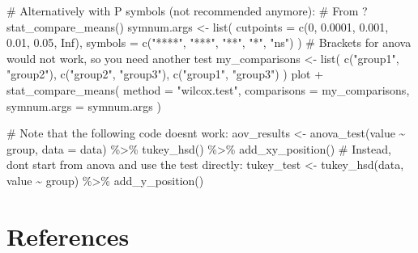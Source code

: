 \documentclass[
  letterpaper,
  DIV=11,
  numbers=noendperiod]{scrreprt}
\newenvironment{Shaded}{\begin{snugshade}}{\end{snugshade}}
\newcommand{\AttributeTok}[1]{\textcolor[rgb]{0.40,0.45,0.13}{#1}}
\newcommand{\CommentTok}[1]{\textcolor[rgb]{0.37,0.37,0.37}{#1}}
\newcommand{\ConstantTok}[1]{\textcolor[rgb]{0.56,0.35,0.01}{#1}}
\newcommand{\DecValTok}[1]{\textcolor[rgb]{0.68,0.00,0.00}{#1}}
\newcommand{\FloatTok}[1]{\textcolor[rgb]{0.68,0.00,0.00}{#1}}
\newcommand{\FunctionTok}[1]{\textcolor[rgb]{0.28,0.35,0.67}{#1}}
\newcommand{\NormalTok}[1]{\textcolor[rgb]{0.00,0.23,0.31}{#1}}
\newcommand{\OtherTok}[1]{\textcolor[rgb]{0.00,0.23,0.31}{#1}}
\newcommand{\SpecialCharTok}[1]{\textcolor[rgb]{0.37,0.37,0.37}{#1}}
\newcommand{\StringTok}[1]{\textcolor[rgb]{0.13,0.47,0.30}{#1}}
\newlength{\cslhangindent}
\newlength{\cslentryspacingunit} %
\newenvironment{CSLReferences}[2] %
 {%
  \setlength{\parindent}{0pt}
  \ifodd #1
  \let\oldpar\par
  \def\par{\hangindent=\cslhangindent\oldpar}
  \fi
  \setlength{\parskip}{#2\cslentryspacingunit}
 }%
 {}
\begin{document}
\begin{Shaded}
\begin{Highlighting}[]
\CommentTok{\# Alternatively with P symbols (not recommended anymore):}
    \CommentTok{\# From ?stat\_compare\_means()}
\NormalTok{    symnum.args }\OtherTok{\textless{}{-}}
      \FunctionTok{list}\NormalTok{(}
        \AttributeTok{cutpoints =} \FunctionTok{c}\NormalTok{(}\DecValTok{0}\NormalTok{, }\FloatTok{0.0001}\NormalTok{, }\FloatTok{0.001}\NormalTok{, }\FloatTok{0.01}\NormalTok{, }\FloatTok{0.05}\NormalTok{, }\ConstantTok{Inf}\NormalTok{),}
        \AttributeTok{symbols =} \FunctionTok{c}\NormalTok{(}\StringTok{"****"}\NormalTok{, }\StringTok{"***"}\NormalTok{, }\StringTok{"**"}\NormalTok{, }\StringTok{"*"}\NormalTok{, }\StringTok{"ns"}\NormalTok{)}
\NormalTok{      )}
    \CommentTok{\# Brackets for anova would not work, so you need another test}
\NormalTok{    my\_comparisons }\OtherTok{\textless{}{-}}
      \FunctionTok{list}\NormalTok{(}
        \FunctionTok{c}\NormalTok{(}\StringTok{"group1"}\NormalTok{, }\StringTok{"group2"}\NormalTok{),}
        \FunctionTok{c}\NormalTok{(}\StringTok{"group2"}\NormalTok{, }\StringTok{"group3"}\NormalTok{),}
        \FunctionTok{c}\NormalTok{(}\StringTok{"group1"}\NormalTok{, }\StringTok{"group3"}\NormalTok{)}
\NormalTok{      )}
\NormalTok{    plot }\SpecialCharTok{+} \FunctionTok{stat\_compare\_means}\NormalTok{(}
      \AttributeTok{method =} \StringTok{"wilcox.test"}\NormalTok{,}
      \AttributeTok{comparisons =}\NormalTok{ my\_comparisons,}
      \AttributeTok{symnum.args =}\NormalTok{ symnum.args}
\NormalTok{    )}
\end{Highlighting}
\end{Shaded}

\begin{Shaded}
\begin{Highlighting}[]
\CommentTok{\# Note that the following code doesn\textquotesingle{}t work:}
\NormalTok{aov\_results }\OtherTok{\textless{}{-}} \FunctionTok{anova\_test}\NormalTok{(value }\SpecialCharTok{\textasciitilde{}}\NormalTok{ group, }\AttributeTok{data =}\NormalTok{ data) }\SpecialCharTok{\%\textgreater{}\%}
  \FunctionTok{tukey\_hsd}\NormalTok{() }\SpecialCharTok{\%\textgreater{}\%}
  \FunctionTok{add\_xy\_position}\NormalTok{()}
\CommentTok{\# Instead, don\textquotesingle{}t start from anova and use the test directly:}
\NormalTok{tukey\_test }\OtherTok{\textless{}{-}} \FunctionTok{tukey\_hsd}\NormalTok{(data, value }\SpecialCharTok{\textasciitilde{}}\NormalTok{ group) }\SpecialCharTok{\%\textgreater{}\%} \FunctionTok{add\_y\_position}\NormalTok{()}
\end{Highlighting}
\end{Shaded}


\hypertarget{references}{%
\chapter*{References}\label{references}}


\hypertarget{refs}{}
\begin{CSLReferences}{0}{0}
\end{CSLReferences}
\end{document}
